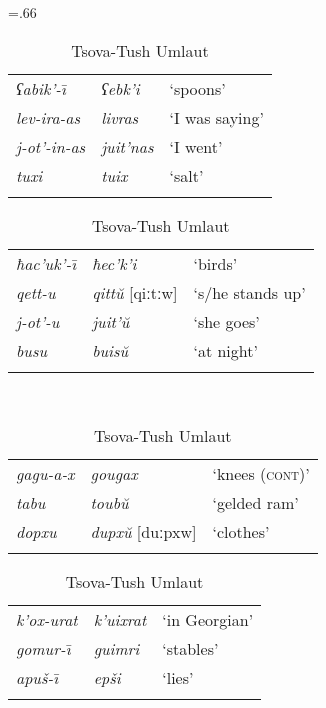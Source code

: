 \begin{table}
	\small
	\tabcolsep=.66\tabcolsep
	\begin{subtable}[t]{.45\textwidth}
	\centering
	\caption{}
	\begin{tabular}{lll}
		\lsptoprule
		\textit{ʕabik'-\={\i}} & \textit{ʕebk'i} & `spoons' \\
		
		\textit{lev-ira-as} & \textit{livras} & `I was saying' \\
		
		\textit{j-ot'-in-as} & \textit{juit'nas} & `I went' \\
		
		\textit{tuxi} & \textit{tuix} & `salt' \\
		\lspbottomrule
	\end{tabular}
	\end{subtable}%
	\begin{subtable}[t]{.55\textwidth}
	\centering
	\caption{}
	\begin{tabular}{lll}
		\lsptoprule
		\textit{ħac'uk'-\={\i}} & \textit{ħec'k'i} & `birds' \\
		
		\textit{qett-u} & \textit{qitt\u{u}} [qiːtːw] & `s/he stands up' \\
		
		\textit{j-ot'-u} & \textit{juit'\u{u}} & `she goes' \\
		
		\textit{busu} & \textit{buis\u{u}} & `at night' \\
		\lspbottomrule
	\end{tabular}
	\end{subtable}\medskip\\
	\begin{subtable}[t]{.55\textwidth}
	\centering
	\caption{}
	\begin{tabular}{lll}
		\lsptoprule
		\textit{gagu-a-x} & \textit{gougax} & `knees (\textsc{cont})' \\
		\textit{tabu} & \textit{toub\u{u}} & `gelded ram' \\
		\textit{dopxu} & \textit{dupx\u{u}} [duːpxw]& `clothes' \\
		\lspbottomrule
	\end{tabular}
	\end{subtable}%
	\begin{subtable}[t]{.45\textwidth}
	\centering
	\caption{}
	\begin{tabular}{lll}
		\lsptoprule
		\textit{k'ox-urat} & \textit{k'uixrat} & `in Georgian' \\
		\textit{gomur-\={\i}} & \textit{guimri} & `stables' \\
		\textit{apuš-\={\i}} & \textit{epši} & `lies' \\
		\lspbottomrule
	\end{tabular}
	\end{subtable}
	\caption{Tsova-Tush Umlaut}
	\label{table-umlaut1}
\end{table}

